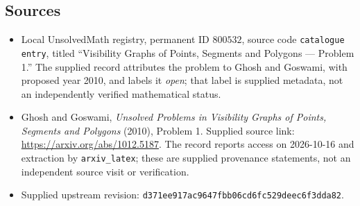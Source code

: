 \documentclass[11pt]{article}
\begin{document}
\subsection{Sources}
\begin{itemize}
\item Local UnsolvedMath registry, permanent ID \(800532\), source code \texttt{catalogue entry}, titled ``Visibility Graphs of Points, Segments and Polygons --- Problem 1.'' The supplied record attributes the problem to Ghosh and Goswami, with proposed year 2010, and labels it \emph{open}; that label is supplied metadata, not an independently verified mathematical status.
\item Ghosh and Goswami, \emph{Unsolved Problems in Visibility Graphs of Points, Segments and Polygons} (2010), Problem 1. Supplied source link: \url{https://arxiv.org/abs/1012.5187}. The record reports access on 2026-10-16 and extraction by \texttt{arxiv\_latex}; these are supplied provenance statements, not an independent source visit or verification.
\item Supplied upstream revision: \texttt{d371ee917ac9647fbb06cd6fc529deec6f3dda82}.
\end{itemize}
\end{document}
